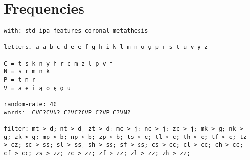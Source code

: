\section{Frequencies}
\begin{kaobox}[frametitle=WIP Lexifer file]
\begin{verbatim}
with: std-ipa-features coronal-metathesis

letters: a ą b c d e ę f g h i k l m n o ǫ p r s t u v y z 

C = t s k n y h r c m z l p v f
N = s r m n k
P = t m r
V = a e i ą o ę ǫ u

random-rate: 40
words:  CVC?CVN? C?VC?CVP C?VP C?VN?

filter: mt > d; nt > d; zt > d; mc > j; nc > j; zc > j; mk > g; nk > g; zk > g; mp > b; np > b; zp > b; ts > c; tl > c; th > c; tf > c; tz > cz; sc > ss; sl > ss; sh > ss; sf > ss; cs > cc; cl > cc; ch > cc; cf > cc; zs > zz; zc > zz; zf > zz; zl > zz; zh > zz;
\end{verbatim}
\end{kaobox}